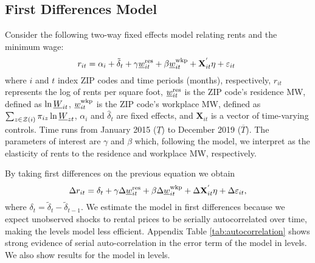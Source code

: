     
\subsection{First Differences Model}

Consider the following two-way fixed effects model relating rents and the 
minimum wage:
\begin{equation*} \label{eq:did_lev}
    r_{it} = \alpha_i + \tilde{\delta}_t 
           + \gamma \underline{w}^{\text{res}}_{it} + \beta \underline{w}^{\text{wkp}}_{it}
           + \mathbf{X}^{'}_{it}\eta
           + \varepsilon_{it} \ 
\end{equation*}    
where
$i$ and $t$ index ZIP codes and time periods (months), respectively,
$r_{it}$ represents the log of rents per square foot,
$\underline{w}^{\text{res}}_{it}$ is the ZIP code's residence MW, defined as 
$\ln \underline{W}_{it}$,
$\underline{w}^{\text{wkp}}_{it}$ is the ZIP code's workplace MW, defined as 
$\sum_{z\in\mathcal{Z}(i)} \pi_{iz}\ln \underline{W}_{zt}$,
$\alpha_i$ and $\hat{\delta}_t$ are fixed effects, and 
$\mathbf{X}_{it}$ is a vector of time-varying controls.
Time runs from January 2015 ($\underline{T}$) to December 2019 ($\overline{T}$).
The parameters of interest are $\gamma$ and $\beta$ which, following the model, 
we interpret as the elasticity of rents to the residence and workplace MW, 
respectively.

By taking first differences on the previous equation we obtain
\begin{equation}\label{eq:fd}
    \Delta r_{it} = \delta_t
                  + \gamma \Delta \underline{w}^{\text{res}}_{it} + \beta \Delta \underline{w}^{\text{wkp}}_{it}
                  + \Delta \mathbf{X}^{'}_{it}\eta
                  + \Delta \varepsilon_{it} ,
\end{equation}
where $\delta_t = \tilde{\delta}_t - \tilde{\delta}_{t-1}$.
We estimate the model in first differences because we expect unobserved shocks
to rental prices to be serially autocorrelated over time, making the levels
model less efficient.
Appendix Table \ref{tab:autocorrelation} shows strong evidence of serial 
auto-correlation in the error term of the model in levels. We also show 
results for the model in levels.

